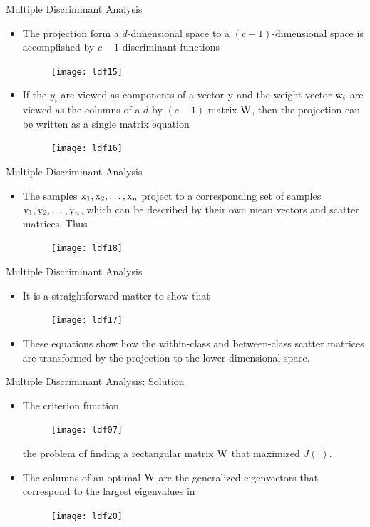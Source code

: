 \begin{frame}{Multiple Discriminant Analysis}
\begin{itemize}
\item The projection form a $d$-dimensional space to a $(c-1)$-dimensional space is accomplished by $c-1$ discriminant functions
\begin{figure}
\texttt{[image: ldf15]}
\end{figure}
\item If the $y_i$ are viewed as components of a vector ${\rm y}$ and the weight vector ${\rm w}_i$ are viewed as the columns of a $d$-by-$(c-1)$ matrix ${\rm W}$, then the projection can be written as a single matrix equation
\begin{figure}
\texttt{[image: ldf16]}
\end{figure}
\end{itemize}
\end{frame}

\begin{frame}{Multiple Discriminant Analysis}
\begin{itemize}
\item The samples ${\rm x}_1,{\rm x}_2,\ldots,{\rm x}_n$ project to a corresponding set of samples ${\rm y}_1,{\rm y}_2,\ldots,{\rm y}_n$, which can be described by their own mean vectors and scatter matrices. Thus
\begin{figure}
\texttt{[image: ldf18]}
\end{figure}
\end{itemize}
\end{frame}

\begin{frame}{Multiple Discriminant Analysis}
\begin{itemize}
\item It is a straightforward matter to show that
\begin{figure}
\texttt{[image: ldf17]}
\end{figure}
\item These equations show how the within-class and between-class scatter matrices are transformed by the projection to the lower dimensional space.
\end{itemize}
\end{frame}



\begin{frame}{Multiple Discriminant Analysis: Solution}
\begin{itemize}
\item The criterion function
\begin{figure}
\texttt{[image: ldf07]}
\end{figure}
the problem of finding a rectangular matrix ${\rm W}$ that maximized $J(\cdot)$. 
\item The columns of an optimal ${\rm W}$ are the generalized eigenvectors that correspond to the largest eigenvalues in
\begin{figure}
\texttt{[image: ldf20]}
\end{figure}
\end{itemize}
\end{frame}

